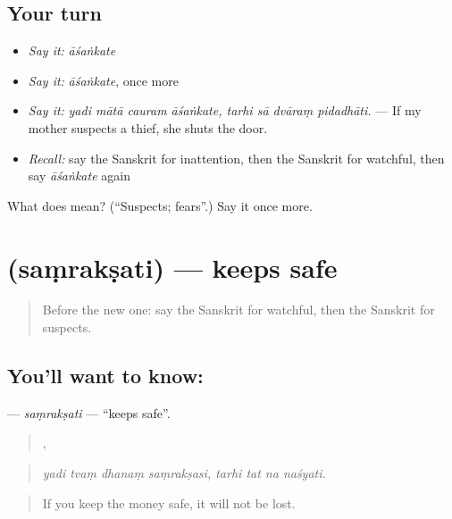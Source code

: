 \subsection*{Your turn}
\begin{itemize}
\raggedright
  \item \emph{Say it:} \emph{āśaṅkate}
  \item \emph{Say it:} \emph{āśaṅkate}, once more
  \item \emph{Say it:} \emph{yadi mātā cauram āśaṅkate, tarhi sā dvāraṃ pidadhāti.} — If my mother suspects a thief, she shuts the door.
  \item \emph{Recall:} say the Sanskrit for inattention, then the Sanskrit for watchful, then say \emph{āśaṅkate} again
\end{itemize}

\begin{tcolorbox}[breakable,colback=teal!4,colframe=teal!35!black,title={Before you move on}]
What does  mean? (\textquotedblleft{}Suspects; fears\textquotedblright{}.) Say it once more.
\end{tcolorbox}
\section[\texorpdfstring{\sk{संरक्षति} (saṃrakṣati)}{संरक्षति (saṃrakṣati)}]{ (saṃrakṣati) — keeps safe}

\label{lesson:SA-C539-samraksati}



\begin{quote}
Before the new one: say the Sanskrit for watchful, then the Sanskrit for suspects.
\end{quote}

\subsection*{You'll want to know: }
\textbf{} — \emph{saṃrakṣati} — \textquotedblleft{}keeps safe\textquotedblright{}.

\begin{quote}
   ,    
\end{quote}

\begin{quote}
\emph{yadi tvaṃ dhanaṃ saṃrakṣasi, tarhi tat na naśyati.}
\end{quote}

\begin{quote}
If you keep the money safe, it will not be lost.
\end{quote}

